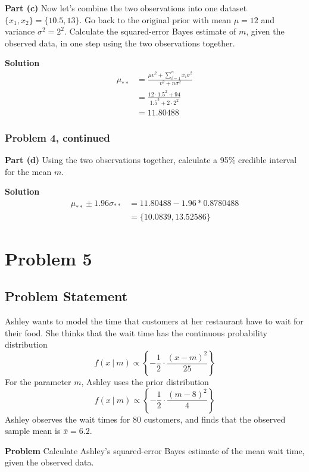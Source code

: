 \documentclass[12pt]{article}
\theoremstyle{definition}
\begin{document}
\noindent
{\bf Part (c)} Now let's combine the two observations into one dataset $\{x_1, x_2\} = \{10.5, 13\}$. Go back to the original prior with mean $\mu = 12$ and variance $\sigma^2 = 2^2$. Calculate the squared-error Bayes estimate of $m$, given the observed data, in one step using the two observations together.

\bigskip
\noindent
{\bf Solution} 
\begin{align*}
\mu_{**} &= \frac{\mu v^2 + \sum_{i=1}^n x_i \sigma^2}{v^2 + n\sigma^2}\\
&= \frac{12 \cdot 1.5^2 + 94}{1.5^2 + 2 \cdot 2^2}\\
&= 11.80488
\end{align*}

\newpage
\subsubsection*{Problem 4, continued}

\noindent
{\bf Part (d)} Using the two observations together, calculate a 95\% credible interval for the mean $m$.

\bigskip
\noindent
{\bf Solution} 
\begin{align*}
\mu_{**} \pm 1.96\sigma_{**} &= 11.80488 - 1.96 * 0.8780488\\
&= \{10.0839, 13.52586\}
\end{align*}


\newpage
\section*{Problem 5}

\subsection*{Problem Statement}

Ashley wants to model the time that customers at her restaurant have to wait for their food. She thinks that the wait time has the continuous probability distribution
$$
f(x\ |\ m) \propto \left \{ - \frac{1}{2} \cdot \frac{ (x - m)^2}{25} \right \}
$$
For the parameter $m$, Ashley uses the prior distribution
$$
f(x\ |\ m) \propto \left \{ - \frac{1}{2} \cdot \frac{ (m - 8)^2}{4} \right \}
$$
Ashley observes the wait times for 80 customers, and finds that the observed sample mean is $\overline{x} = 6.2$.

\bigskip
\noindent
{\bf Problem} Calculate Ashley's squared-error Bayes estimate of the mean wait time, given the observed data.
\end{document}
